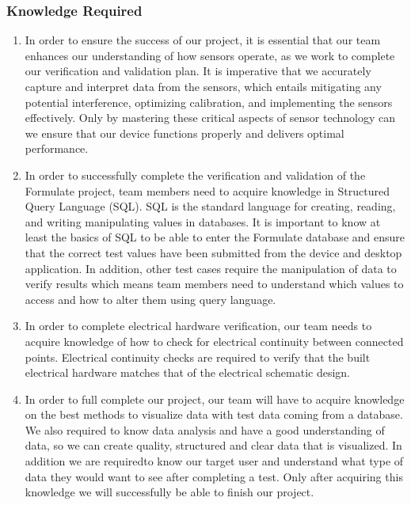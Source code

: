 \documentclass[12pt, titlepage]{article}
\begin{document}
\subsubsection{Knowledge Required}
  \begin{enumerate}
    \item In order to ensure the success of our project, it is essential that our team enhances our understanding of how sensors operate, as we work to complete our verification and validation plan. It is imperative that we accurately capture and interpret data from the sensors, which entails mitigating any potential interference, optimizing calibration, and implementing the sensors effectively. Only by mastering these critical aspects of sensor technology can we ensure that our device functions properly and delivers optimal performance.
    \item In order to successfully complete the verification and validation of the Formulate project, team members need to acquire knowledge in Structured Query Language (SQL). SQL is the standard language for creating, reading, and writing manipulating values in databases. It is important to know at least the basics of SQL to be able to enter the Formulate database and ensure that the correct test values have been submitted from the device and desktop application. In addition, other test cases require the manipulation of data to verify results which means team members need to understand which values to access and how to alter them using query language.
    \item In order to complete electrical hardware verification, our team needs to acquire knowledge of how to check for electrical continuity between connected points. Electrical continuity checks are required to verify that the built electrical hardware matches that of the electrical schematic design.
    \item In order to full complete our project, our team will have to acquire knowledge on the best methods to visualize data with test data coming from a database. We also required to know data analysis and have a good understanding of data, so we can create quality, structured and clear data that is visualized. In addition we are requiredto know our target user and understand what type of data they would want to see after completing a test. Only after acquiring this knowledge we will successfully be able to finish our project.
  \end{enumerate}
\end{document}
